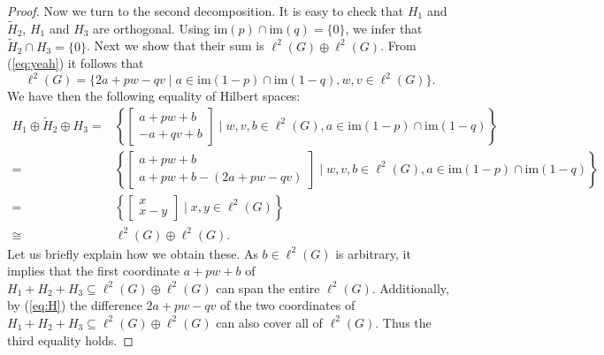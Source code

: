 \documentclass[a4paper,leqno,12pt]{article}
\numberwithin{equation}{section}
\theoremstyle{plain}
\theoremstyle{definition}
\theoremstyle{remark}
\begin{document}
\begin{proof}
		Now we turn to the second decomposition. It is easy to check that $H_1$ and $\tilde H_2$, $H_1$ and $H_3$ are orthogonal.
		Using $\mathrm{im}(p)\cap\mathrm{im}(q)=\{0\}$, we infer that $\tilde H_2\cap H_3=\{0\}$.
		Next we show that their sum is $\ell^2(G)\oplus \ell^2(G)$.
		From (\ref{eq:yeah}) it follows that 
		\begin{equation}
			\label{eq:H}
			\ell^2(G)=\{2a+pw-qv \mid a\in\mathrm{im}(1-p)\cap\mathrm{im}(1-q), w,v\in \ell^2(G)\}.
		\end{equation}
		We have then the following equality of Hilbert spaces:
		\begin{align}
			\label{eq:H123}
			H_1\oplus \tilde H_2\oplus H_3=&\left\{ 
			\begin{bmatrix} a+pw+b \\ -a+qv+b\end{bmatrix} \mid w,v,b\in \ell^2(G), a\in  \mathrm{im}(1-p)\cap\mathrm{im}(1-q)\right\} \\
			=& \left\{ 
			\begin{bmatrix} a+pw+b \\ a+pw+b-(2a+pw-qv) \end{bmatrix} \mid w,v,b\in \ell^2(G), a\in  \mathrm{im}(1-p)\cap\mathrm{im}(1-q)
			\right\}\\
			=&\left\{\begin{bmatrix}x\\ x-y\end{bmatrix} \mid x,y\in \ell^2(G) \right\} \\
			\cong & \ell^2(G)\oplus \ell^2(G) \label{eq5}.
		\end{align}
		Let us briefly explain how we obtain these. As $b\in \ell^2(G)$ is arbitrary, it implies that the first coordinate $a+pw+b$ of $H_1+H_2+H_3\subseteq \ell^2(G)\oplus \ell^2(G)$ can span the entire  $\ell^2(G)$. Additionally, by (\ref{eq:H}) the difference $2a+pw-qv$ of the two coordinates of $H_1+H_2+H_3\subseteq \ell^2(G)\oplus \ell^2(G)$ can also cover all of $\ell^2(G)$. Thus the third equality holds.

\end{proof}
\end{document}
